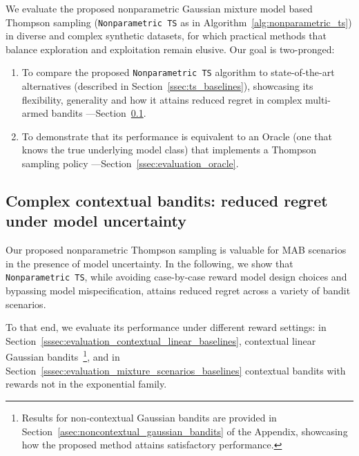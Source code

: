 
We evaluate the proposed nonparametric Gaussian mixture model based Thompson sampling (\ie \texttt{Nonparametric TS} as in Algorithm~\ref{alg:nonparametric_ts}) in diverse and complex synthetic datasets, for which practical methods that balance exploration and exploitation remain elusive.
Our goal is two-pronged:
\begin{enumerate}
	\item To compare the proposed \texttt{Nonparametric TS} algorithm to state-of-the-art alternatives (described in Section~\ref{ssec:ts_baselines}), showcasing its flexibility, generality and how it attains reduced regret in complex multi-armed bandits ---Section~\ref{ssec:evaluation_baselines}.
	\item To demonstrate that its performance is equivalent to an Oracle (\ie one that knows the true underlying model class) that implements a Thompson sampling policy ---Section~\ref{ssec:evaluation_oracle}.
\end{enumerate}



\subsection{Complex contextual bandits: reduced regret under model uncertainty}
\label{ssec:evaluation_baselines}

Our proposed nonparametric Thompson sampling is valuable for MAB scenarios in the presence of model uncertainty.
In the following, we show that \texttt{Nonparametric TS}, while avoiding case-by-case reward model design choices and bypassing model mispecification, attains reduced regret across a variety of bandit scenarios.

To that end, we evaluate its performance under different reward settings: in Section~\ref{sssec:evaluation_contextual_linear_baselines}, contextual linear Gaussian bandits~\footnote{Results for non-contextual Gaussian bandits are provided in Section~\ref{asec:noncontextual_gaussian_bandits} of the Appendix, showcasing how the proposed method attains satisfactory performance.}, and in Section~\ref{sssec:evaluation_mixture_scenarios_baselines} contextual bandits with rewards not in the exponential family.





